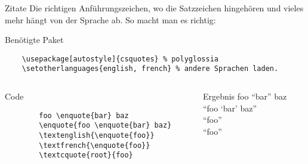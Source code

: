 \begin{frame}[fragile]{Zitate}
  Die richtigen Anführungszeichen, wo die Satzzeichen hingehören und vieles mehr hängt von der Sprache ab.
  So macht man es richtig:
  \begin{block}{Benötigte Paket}
    \begin{lstlisting}
    \usepackage[autostyle]{csquotes} % polyglossia
    \setotherlanguages{english, french} % andere Sprachen laden.
    \end{lstlisting}
  \end{block}
  \begin{columns}[onlytextwidth, t]
    \begin{column}{0.60\textwidth}
      \begin{block}{Code}
        \begin{lstlisting}
        foo \enquote{bar} baz
        \enquote{foo \enquote{bar} baz}
        \textenglish{\enquote{foo}}
        \textfrench{\enquote{foo}}
        \textcquote{root}{foo}
        \end{lstlisting}
      \end{block}
    \end{column}
    \begin{column}{0.36\textwidth}
      \begin{block}{Ergebnis}
        foo \enquote{bar} baz \\
        \enquote{foo \enquote{bar} baz} \\
        \textenglish{\enquote{foo}} \\
        \textfrench{ \enquote{foo}} \\
      \end{block}
    \end{column}
  \end{columns}
\end{frame}
